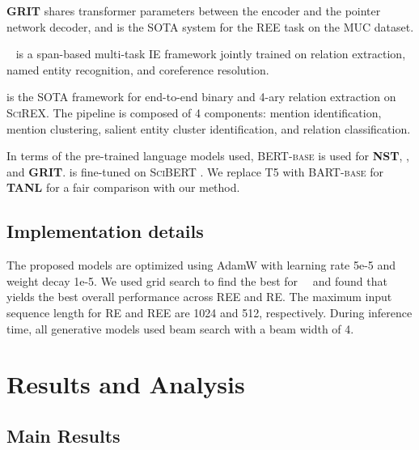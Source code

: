 \documentclass[11pt]{article}
\begin{document}
\textbf{GRIT} \cite{du-2020-grit} shares transformer parameters between the encoder and the pointer network decoder, and is the SOTA system for the REE task on the MUC dataset. 

\textbf{\dygiepp}\ \cite{wadden-etal-2019-entity} is a span-based multi-task IE framework jointly trained on relation extraction, named entity recognition, and coreference resolution. 

\textbf{\scirexpipeline} \cite{jain-etal-2020-scirex} is the SOTA framework for end-to-end binary and 4-ary relation extraction on \textsc{SciREX}. The pipeline is composed of 4 components: mention identification, mention clustering, salient entity cluster identification, and relation classification.  

In terms of the pre-trained language models used, \textsc{BERT-base} \cite{Devlin_2019} is used for \textbf{NST}, \textbf{\dygiepp}, and \textbf{GRIT}. \textbf{\scirexpipeline} is fine-tuned on \textsc{SciBERT} \cite{beltagy-etal-2019-scibert}. We replace \textsc{T5} \cite{JMLR:v21:20-074} with \textsc{BART-base} for \textbf{TANL} for a fair comparison with our method.

\subsection{Implementation details}
The proposed models are optimized using AdamW \cite{loshchilov2018decoupled} with learning rate 5e-5 and weight decay 1e-5. We used grid search to find the best  for \topkcopy \ \ and found that  yields the best overall performance across REE and RE. The maximum input sequence length for RE and REE are 1024 and 512, respectively. During inference time, all generative models used beam search with a beam width of 4.


%
 
\section{Results and Analysis}

\subsection{Main Results} 
\end{document}
